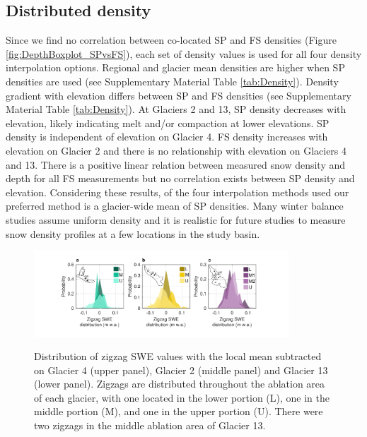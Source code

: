 \documentclass[twocolumn, letterpaper]{igs}
\begin{document}
\subsection{Distributed density}

Since we find no correlation between co-located SP and FS densities (Figure \ref{fig:DepthBoxplot_SPvsFS}), each set of density values is used for all four density interpolation options. Regional and glacier mean densities are higher when SP densities are used (see Supplementary Material Table \ref{tab:Density}). Density gradient with elevation differs between SP and FS densities (see Supplementary Material Table \ref{tab:Density}). At Glaciers 2 and 13, SP density decreases with elevation, likely indicating melt and/or compaction at lower elevations. SP density is independent of elevation on Glacier 4. FS density increases with elevation on Glacier 2 and there is no relationship with elevation on Glaciers 4 and 13. There is a positive linear relation between measured snow density and depth for all FS measurements but no correlation exists between SP density and elevation. Considering these results, of the four interpolation methods used our preferred method is a glacier-wide mean of SP densities. Many winter balance studies assume uniform density \citep[e.g.][]{Elder1991,McGrath2015,Cullen2017} and it is realistic for future studies to measure snow density profiles at a few locations in the study basin.

\begin{figure}
	\centering
	\includegraphics[width =0.85\textwidth]{ZigzagHistogram.pdf}\\
	\caption{Distribution of zigzag SWE values with the local mean subtracted on Glacier 4 (upper panel), Glacier 2 (middle panel) and Glacier 13 (lower panel). Zigzags are distributed throughout the ablation area of each glacier, with one located in the lower portion (L), one in the middle portion (M), and one in the upper portion (U). There were two zigzags in the middle ablation area of Glacier 13.}
	\label{fig:ZigzagHistogram}
\end{figure}
\end{document}
